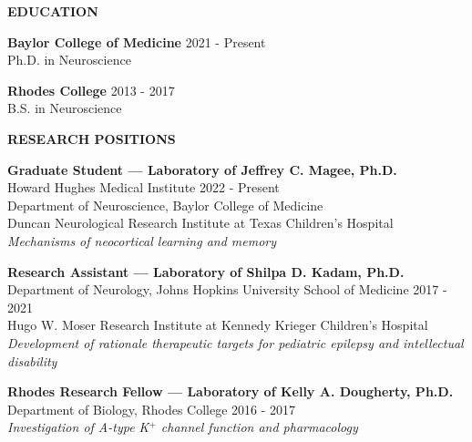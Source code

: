 \documentclass{resume} %
\begin{document}
\begin{rSection}{{\bfseries EDUCATION}}
 
    {\bfseries Baylor College of Medicine} \hfill { 2021 - Present }
    \\ Ph.D. in Neuroscience 
    \vspace{0.5\baselineskip}

    {\bfseries Rhodes College} \hfill { 2013 - 2017  }
    \\ B.S. in Neuroscience 
    \end{rSection}


\begin{rSection}{{\bfseries RESEARCH POSITIONS}}
    
    {\bfseries Graduate Student — Laboratory of Jeffrey C. Magee, Ph.D.}
    \\ Howard Hughes Medical Institute \hfill {2022 - Present}
    \\ Department of Neuroscience, Baylor College of Medicine
    \\ Duncan Neurological Research Institute at Texas Children’s Hospital \vspace{0.3\baselineskip}
    \\ \textit{Mechanisms of neocortical learning and memory}

    {\bfseries Research Assistant — Laboratory of Shilpa D. Kadam, Ph.D.} 
    \\ Department of Neurology, Johns Hopkins University School of Medicine \hfill {2017 - 2021}
    \\ Hugo W. Moser Research Institute at Kennedy Krieger Children’s Hospital \vspace{0.3\baselineskip}
    \\ \textit{Development of rationale therapeutic targets for pediatric epilepsy and intellectual disability}

    {\bfseries Rhodes Research Fellow — Laboratory of Kelly A. Dougherty, Ph.D.}  
    \\ Department of Biology, Rhodes College \hfill {2016 - 2017} \vspace{0.3\baselineskip}
    \\ \textit{ Investigation of A-type K$^+$ channel function and pharmacology}
\end{rSection}
\end{document}
